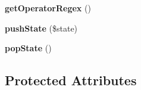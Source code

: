 \begin{DoxyCompactItemize}
\item 
\hypertarget{class_twig___lexer_a913a065161fe1951bffdd776414a6643}{}{\bfseries get\+Operator\+Regex} ()\label{class_twig___lexer_a913a065161fe1951bffdd776414a6643}

\item 
\hypertarget{class_twig___lexer_a6afabfaebdb88d6101172b462198eead}{}{\bfseries push\+State} (\$state)\label{class_twig___lexer_a6afabfaebdb88d6101172b462198eead}

\item 
\hypertarget{class_twig___lexer_a5f794f6e5f021c7755fb4dd8145f8f75}{}{\bfseries pop\+State} ()\label{class_twig___lexer_a5f794f6e5f021c7755fb4dd8145f8f75}

\end{DoxyCompactItemize}
\subsection*{Protected Attributes}
